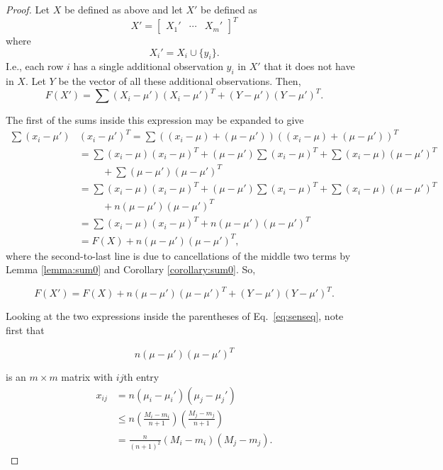 \documentclass[11pt, oneside]{article}   	%
\begin{document}
\begin{proof}
Let $X$ be defined as above and let $X'$ be defined as 
$$ X' = 
\begin{bmatrix}
X_1' & \cdots & X_m' 
\end{bmatrix}^T
$$
where
$$ X_i' = X_i \cup \{y_i\}.$$
I.e., each row $i$ has a single additional observation $y_i$ in $X'$ that it does not have in $X$.
Let $Y$ be the vector of all these additional observations. Then,
$$ F(X') =\sum (X_i - \mu')(X_i - \mu')^T + (Y-\mu')(Y-\mu')^T.$$

The first of the sums inside this expression may be expanded to give
\begin{align*}
\sum (x_i - \mu')&(x_i - \mu')^T = \sum ((x_i-\mu)+(\mu-\mu'))((x_i-\mu)+(\mu-\mu'))^T\\
	&= \sum (x_i - \mu)(x_i-\mu)^T + (\mu - \mu')\sum (x_i-\mu)^T + \sum (x_i-\mu)(\mu-\mu')^T \\
	&  \hspace{1cm} + \sum (\mu-\mu')(\mu-\mu')^T\\
	&= \sum (x_i - \mu)(x_i-\mu)^T + (\mu - \mu')\sum (x_i-\mu)^T + \sum (x_i-\mu)(\mu-\mu')^T \\
	&  \hspace{1cm} +n (\mu-\mu')(\mu-\mu')^T\\
	&= \sum (x_i - \mu)(x_i-\mu)^T + n (\mu-\mu')(\mu-\mu')^T \\
	&= F(X) + n (\mu-\mu')(\mu-\mu')^T,
\end{align*}
where the second-to-last line is due to cancellations of the middle two terms by Lemma \ref{lemma:sum0} and Corollary \ref{corollary:sum0}. So,

\begin{equation}
\label{eq:senseq}
F(X') =  F(X) + n(\mu-\mu')(\mu-\mu')^T + (Y-\mu')(Y-\mu')^T.
\end{equation}

Looking at the two expressions inside the parentheses of Eq.~\ref{eq:senseq}, note first that

$$ n(\mu-\mu')(\mu-\mu')^T $$

is an $m \times m$ matrix with $ij$th entry
\begin{align}
x_{ij} &= n(\mu_i - \mu_i')(\mu_j - \mu_j') \nonumber \\
	&\le n\left(\frac{M_i - m_i}{n+1}\right)\left(\frac{M_j - m_j}{n+1}\right) \nonumber \\
	&= \frac{n}{(n+1)^2} (M_i-m_i)(M_j-m_j).
\label{eq:firstterm}
\end{align}


\end{proof}
\end{document}

